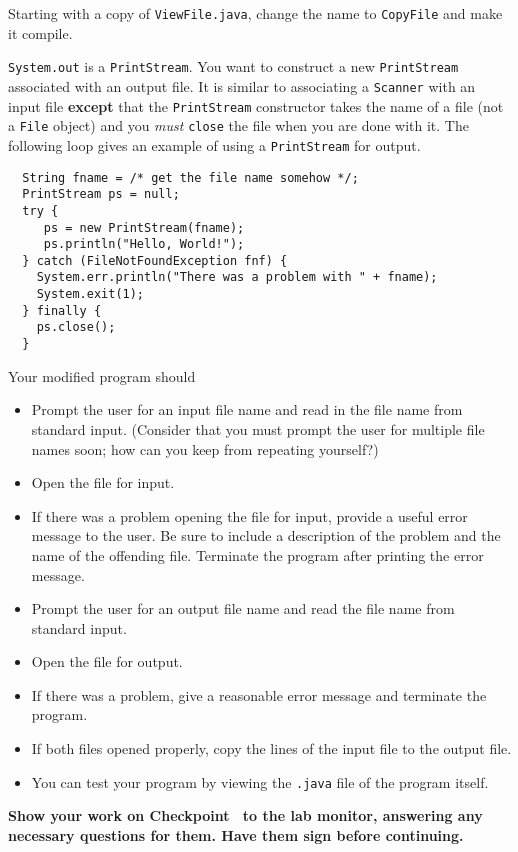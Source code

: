 \documentclass[12pt,oneside]{memoir}
\newcommand\code[1]{\lstinline^#1^}
\newcommand\fname[1]{\texttt{#1}}
\newenvironment{Checkpoint}[1]{%
  \begin{Exercise}[name={Checkpoint},title={#1}]}{%
  \end{Exercise}%
  \textbf{Show your work on Checkpoint~\theExercise{} to the lab monitor, %
    answering any necessary questions for them.  Have them sign before continuing.}}
\begin{document}
\begin{Checkpoint}{CopyFile.java}
Starting with a copy of \fname{ViewFile.java}, change the name to
\code{CopyFile} and make it compile.

\code{System.out} is a \code{PrintStream}. You want to construct a new
\code{PrintStream} associated with an output file. It is similar to
associating a \code{Scanner} with an input file \textbf{except} that
the \code{PrintStream} constructor takes the name of a file (not a
\code{File} object) and you \emph{must} \code{close} the file when you
are done with it. The following loop gives an example of using a
\code{PrintStream} for output.

\begin{lstlisting}
  String fname = /* get the file name somehow */;
  PrintStream ps = null;
  try {
     ps = new PrintStream(fname);
     ps.println("Hello, World!");
  } catch (FileNotFoundException fnf) {
    System.err.println("There was a problem with " + fname);
    System.exit(1);
  } finally {
    ps.close();
  } 
\end{lstlisting}

Your modified program should 
\begin{itemize}
\item Prompt the user for an input file name and read in the file name
  from standard input. (Consider that you must prompt the user for
  multiple file names soon; how can you keep from repeating yourself?)
\item Open the file for input.
\item If there was a problem opening the file for input, provide a
  useful error message to the user. Be sure to include a description
  of the problem and the name of the offending file. Terminate the
  program after printing the error message.
\item Prompt the user for an output file name and read the  file name
  from standard input.
\item Open the file for output.
\item If there was a problem, give a reasonable error message and
  terminate the program.
\item If both files opened properly, copy the lines of the input file to
  the output file.
\item You can test your program by viewing the \fname{.java} file of
  the program itself.
\end{itemize}
\end{Checkpoint}
\end{document}

